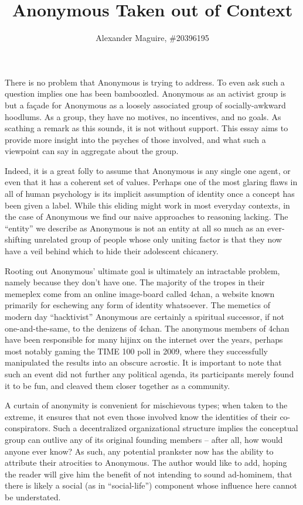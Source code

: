 \documentclass{article}
\title{Anonymous Taken out of Context}
\author{Alexander Maguire, \#20396195}
\begin{document}
\maketitle

There is no problem that Anonymous is trying to address. To even ask such a question implies one has been bamboozled.
Anonymous as an activist group is but a fa\c{c}ade for Anonymous as a loosely associated group of socially-awkward
hoodlums. As a group, they have no motives, no incentives, and no goals. As scathing a remark as this sounds, it is not
without support. This essay aims to provide more insight into the psyches of those involved, and what such a viewpoint
can say in aggregate about the group.

Indeed, it is a great folly to assume that Anonymous is any single one agent, or even that it has a coherent set of
values. Perhaps one of the most glaring flaws in all of human psychology is its implicit assumption of identity once a
concept has been given a label. While this eliding might work in most everyday contexts, in the case of Anonymous we
find our naive approaches to reasoning lacking. The ``entity'' we describe as Anonymous is not an entity at all so much
as an ever-shifting unrelated group of people whose only uniting factor is that they now have a veil behind which to
hide their adolescent chicanery.

Rooting out Anonymous' ultimate goal is ultimately an intractable problem, namely because they don't have one. The
majority of the tropes in their memeplex come from an online image-board called 4chan, a website known primarily for
eschewing any form of identity whatsoever. The memetics of modern day ``hacktivist'' Anonymous are certainly a spiritual
successor, if not one-and-the-same, to the denizens of 4chan. The anonymous members of 4chan have been responsible for
many hijinx on the internet over the years, perhaps most notably gaming the TIME 100 poll in 2009, where they
successfully manipulated the results into an obscure acrostic. It is important to note that such an event did not
further any political agenda, its participants merely found it to be fun, and cleaved them closer together as a
community.

A curtain of anonymity is convenient for mischievous types; when taken to the extreme, it ensures that not even those
involved know the identities of their co-conspirators. Such a decentralized organizational structure implies the
conceptual group can outlive any of its original founding members -- after all, how would anyone ever know? As such, any
potential prankster now has the ability to attribute their atrocities to Anonymous. The author would like to add, hoping
the reader will give him the benefit of not intending to sound ad-hominem, that there is likely a social (as in
``social-life'') component whose influence here cannot be understated.
\end{document}
